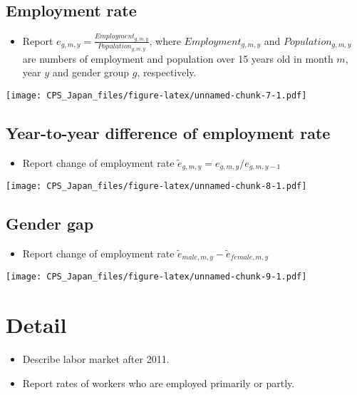 \documentclass[
]{book}
\providecommand{\tightlist}{%
  \setlength{\itemsep}{0pt}\setlength{\parskip}{0pt}}
\begin{document}
\hypertarget{employment-rate-1}{%
\section{Employment rate}\label{employment-rate-1}}

\begin{itemize}
\tightlist
\item
  Report \(e_{g,m,y} = \frac{Employment_{g,m,y}}{Population_{g,m,y}}\), where \(Employment_{g,m,y}\) and \(Population_{g,m,y}\) are numbers of employment and population over 15 years old in month \(m\), year \(y\) and gender group \(g\), respectively.
\end{itemize}

\texttt{[image: CPS\_Japan\_files/figure-latex/unnamed-chunk-7-1.pdf]}

\hypertarget{year-to-year-difference-of-employment-rate-1}{%
\section{Year-to-year difference of employment rate}\label{year-to-year-difference-of-employment-rate-1}}

\begin{itemize}
\tightlist
\item
  Report change of employment rate \(\tilde e_{g,m,y}=e_{g,m,y}/e_{g,m,y-1}\)
\end{itemize}

\texttt{[image: CPS\_Japan\_files/figure-latex/unnamed-chunk-8-1.pdf]}

\hypertarget{gender-gap-1}{%
\section{Gender gap}\label{gender-gap-1}}

\begin{itemize}
\tightlist
\item
  Report change of employment rate \(\tilde e_{male,m,y} - \tilde e_{female,m,y}\)
\end{itemize}

\texttt{[image: CPS\_Japan\_files/figure-latex/unnamed-chunk-9-1.pdf]}

\hypertarget{detail}{%
\chapter{Detail}\label{detail}}

\begin{itemize}
\item
  Describe labor market after 2011.
\item
  Report rates of workers who are employed primarily or partly.
\end{itemize}
\end{document}
